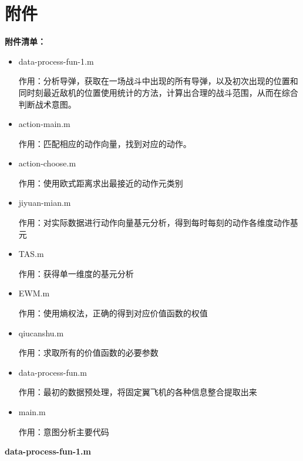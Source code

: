 \documentclass{my_paper}
\begin{document}
\section{附件}
\textbf{附件清单：}
\begin{itemize}
    \item data-process-fun-1.m
    
    作用：分析导弹，获取在一场战斗中出现的所有导弹，以及初次出现的位置和同时刻最近敌机的位置使用统计的方法，计算出合理的战斗范围，从而在综合判断战术意图。

    \item action-main.m 
    
    作用：匹配相应的动作向量，找到对应的动作。

    \item action-choose.m 
    
    作用：使用欧式距离求出最接近的动作元类别

    \item jiyuan-mian.m
    
    作用：对实际数据进行动作向量基元分析，得到每时每刻的动作各维度动作基元

    \item TAS.m
    
    作用：获得单一维度的基元分析

    \item EWM.m
    
    作用：使用熵权法，正确的得到对应价值函数的权值

    \item qiucanshu.m
    
    作用：求取所有的价值函数的必要参数

    \item data-process-fun.m
    
    作用：最初的数据预处理，将固定翼飞机的各种信息整合提取出来

    \item main.m
    
    作用：意图分析主要代码

\end{itemize}

\textbf{data-process-fun-1.m}
\end{document}
